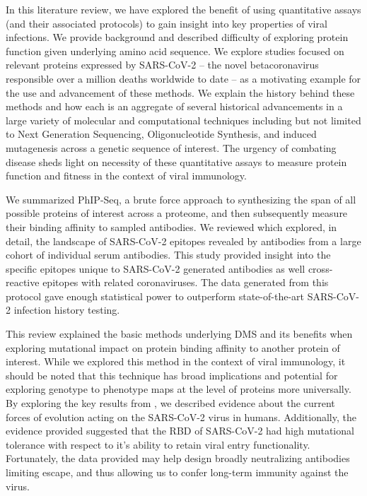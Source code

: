 \documentclass{article}
\begin{document}
In this literature review, we have explored the benefit of using quantitative assays (and their associated protocols) to gain insight into key properties of viral infections.
We provide background and described difficulty of exploring protein function given underlying amino acid sequence.
We explore studies focused on relevant proteins expressed by SARS-CoV-2 -- the novel betacoronavirus responsible over a million deaths worldwide to date -- as a motivating example for the use and advancement of these methods.
We explain the history behind these methods and how each is an aggregate of several historical advancements in a large variety of molecular and computational techniques including but not limited to Next Generation Sequencing, Oligonucleotide Synthesis, and induced mutagenesis across a genetic sequence of interest.
The urgency of combating disease sheds light on necessity of these quantitative assays to measure protein function and fitness in the context of viral immunology.

We summarized PhIP-Seq, a brute force approach to synthesizing the span of all possible proteins of interest across a proteome, and then subsequently measure their binding affinity to sampled antibodies.
We reviewed \citet{Shrock2020} which explored, in detail, the landscape of SARS-CoV-2 epitopes revealed by antibodies from a large cohort of individual serum antibodies.
This study provided insight into the specific epitopes unique to SARS-CoV-2 generated antibodies as well cross-reactive epitopes with related coronaviruses.
The data generated from this protocol gave enough statistical power to outperform state-of-the-art SARS-CoV-2 infection history testing.

This review explained the basic methods underlying DMS and its benefits when exploring mutational impact on protein binding affinity to another protein of interest.
While we explored this method in the context of viral immunology, it should be noted that this technique has broad implications and potential for exploring genotype to phenotype maps at the level of proteins more universally.
By exploring the key results from \citet{Starr2020}, we described evidence about the current forces of evolution acting on the SARS-CoV-2 virus in humans.
Additionally, the evidence provided suggested that the RBD of SARS-CoV-2 had high mutational tolerance with respect to it's ability to retain viral entry functionality.
Fortunately, the data provided may help design broadly neutralizing antibodies limiting escape, and thus allowing us to confer long-term immunity against the virus.
\end{document}
